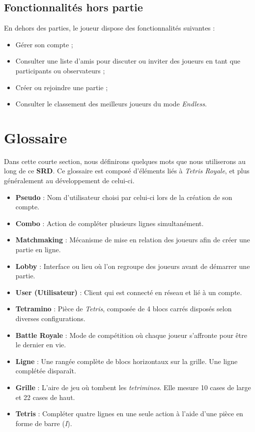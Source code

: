 \documentclass{report}
\begin{document}
\subsection{Fonctionnalités hors partie}
\noindent En dehors des parties, le joueur dispose des fonctionnalités suivantes :
\begin{itemize}
    \item Gérer son compte ;
    \item Consulter une liste d'amis pour discuter ou inviter des joueurs en tant que participants ou observateurs ;
    \item Créer ou rejoindre une partie ;
    \item Consulter le classement des meilleurs joueurs du mode \emph{Endless}.
\end{itemize}

\section{Glossaire}

\noindent Dans cette courte section, nous définirons quelques mots que nous utiliserons au long de ce \textbf{SRD}. Ce glossaire est composé d'éléments liés à \textit{Tetris Royale}, et plus généralement au développement de celui-ci.

\begin{itemize}
    \item\textbf{Pseudo} : Nom d’utilisateur choisi par celui-ci lors de la création de son compte.
    \item\textbf{Combo} : Action de compléter plusieurs lignes simultanément.
    \item\textbf{Matchmaking} : Mécanisme de mise en relation des joueurs afin de créer une partie en ligne.
    \item\textbf{Lobby} : Interface ou lieu où l'on regroupe des joueurs avant de démarrer une partie.
    \item\textbf{User (Utilisateur)} : Client qui est connecté en réseau et lié à un compte.
    \item\textbf{Tetramino} : Pièce de \emph{Tetris}, composée de 4 blocs carrés disposés selon diverses configurations.
    \item\textbf{Battle Royale} : Mode de compétition où chaque joueur s'affronte pour être le dernier en vie.
    \item\textbf{Ligne} : Une rangée complète de blocs horizontaux sur la grille. Une ligne complétée disparaît.
    \item\textbf{Grille} : L'aire de jeu où tombent les \emph{tetriminos}. Elle mesure 10 cases de large et 22 cases de haut.
    \item\textbf{Tetris} : Compléter quatre lignes en une seule action à l’aide d’une pièce en forme de barre (\emph{I}).
\end{itemize}
\end{document}
